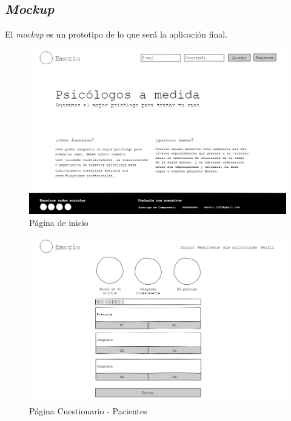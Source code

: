 \subsection{\textit{Mockup}}
El \textit{mockup} es un prototipo de lo que será la aplicación final.

\begin{figure}[htbp] 
    \centering
    \includegraphics[width=1\textwidth]{figuras/mockup_pacientes/inicio.png}
    \caption{Página de inicio}
\end{figure}	


\begin{figure}[htbp] 
    \centering
    \includegraphics[width=1\textwidth]{figuras/mockup_pacientes/cuestionario.png}
    \caption{Página Cuestionario - Pacientes}
\end{figure}	

